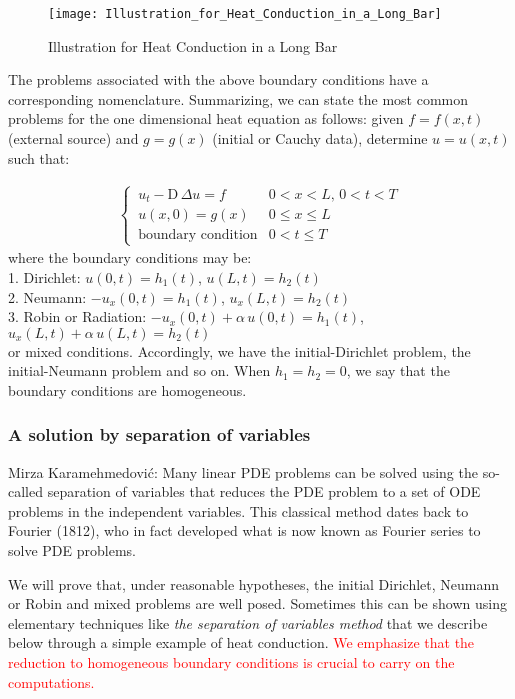 \documentclass[../main.tex]{subfiles}
\begin{document}
\begin{SCfigure}[0.6][h!]
    \texttt{[image: Illustration\_for\_Heat\_Conduction\_in\_a\_Long\_Bar]}
    \caption{Illustration for Heat Conduction in a Long Bar}
    \label{fig:d2}
\end{SCfigure}

The problems associated with the above boundary conditions have a corresponding nomenclature. Summarizing, we can state the most common problems for the one dimensional heat equation as follows: given $f = f(x,t)$ (external source) and $g = g(x)$ (initial or Cauchy data), determine $u = u(x,t)$ such that:

\begin{align}
    \begin{cases}
        \, u_t - \mathrm{D} \, \Delta u = f & 0 < x < L \text{, } 0< t < T \\
        \, u(x,0) = g(x) & 0 \leqslant x \leqslant L \\
        \, \text{boundary condition} & 0 < t \leqslant T
    \end{cases}
\end{align}
where the boundary conditions may be: \\
    1. Dirichlet: $u(0,t) = h_1(t)$, $u(L,t) = h_2(t)$ \\
    2. Neumann: $- u_x(0,t) = h_1(t)$, $u_x(L,t) = h_2(t)$ \\
    3. Robin or Radiation: $- u_x(0,t) + \alpha \, u(0,t) = h_1(t)$, $u_x(L,t) + \alpha \, u(L,t) = h_2(t)$ \\
or mixed conditions. Accordingly, we have the initial-Dirichlet problem, the initial-Neumann problem and so on. When $h_1 = h_2 = 0$, we say that the boundary conditions are homogeneous.

\subsubsection{A solution by separation of variables} \label{sec:2.1.4}

\begin{quotebar}
    Mirza Karamehmedović: Many linear PDE problems can be solved using the so-called separation of variables that reduces the PDE problem to a set of ODE problems in the independent variables. This classical method dates back to Fourier (1812), who in fact developed what is now known as Fourier series to solve PDE problems.
\end{quotebar}

We will prove that, under reasonable hypotheses, the initial Dirichlet, Neumann or Robin and mixed problems are well posed. Sometimes this can be shown using elementary techniques like \textit{the separation of variables method} that we describe below through a simple example of heat conduction. \textcolor{red}{We emphasize that the reduction to homogeneous boundary conditions is crucial to carry on the computations.}
\end{document}
